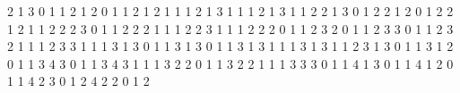    {2}  {1} {3} {0} {1} {1}   %
   {2}  {1} {2} {0} {1} {1}   %
   {2}  {1} {2} {1} {1} {1}   %
   {2}  {1} {3} {1} {1} {1}   %
  {2}  {1} {3} {1} {1} {2}   %
  {2}  {1} {3} {0} {1} {2}   %
  {2}  {1} {2} {0} {1} {2}   %
  {2}  {1} {2} {1} {1} {2}   %
   {2}  {2} {3} {0} {1} {1}   %
   {2}  {2} {2} {1} {1} {1}   %
   {2}  {2} {3} {1} {1} {1}   %
  {2}  {2} {2} {0} {1} {1}   %
   {2}  {3} {2} {0} {1} {1}   %
   {2}  {3} {3} {0} {1} {1}   %
   {2}  {3} {2} {1} {1} {1}   %
   {2}  {3} {3} {1} {1} {1}   %
    {3}  {1} {3} {0} {1} {1}   %
   {3}  {1} {3} {0} {1} {1}   %
   {3}  {1} {3} {1} {1} {1}   %
   {3}  {1} {3} {1} {1} {2}   %
  {3}  {1} {3} {0} {1} {1}   %
   {3}  {1} {2} {0} {1} {1}   %
   {3}  {4} {3} {0} {1} {1}   %
   {3}  {4} {3} {1} {1} {1}   %
   {3}  {2} {2} {0} {1} {1}   %
   {3}  {2} {2} {1} {1} {1}   %
   {3}  {3} {3} {0} {1} {1}   %
    {4}  {1} {3} {0} {1} {1}   %
    {4}  {1} {2} {0} {1} {1}   %
  {4}  {2} {3} {0} {1} {2}   %
  {4}  {2} {2} {0} {1} {2}   %
